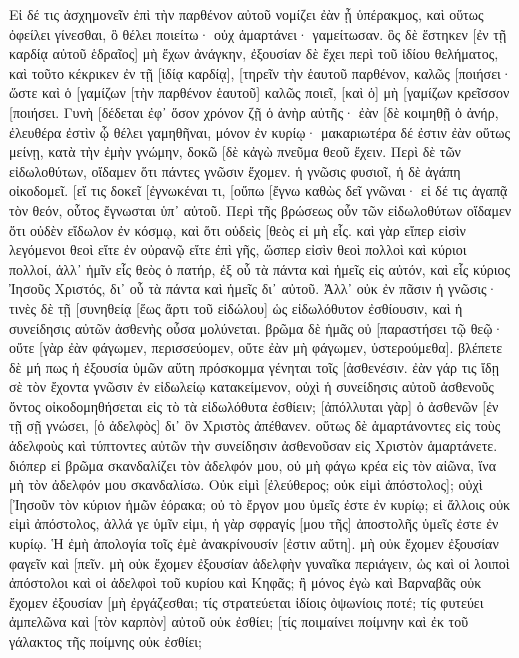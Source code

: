 Εἰ δέ τις ἀσχημονεῖν ἐπὶ τὴν παρθένον αὐτοῦ νομίζει ἐὰν ᾖ ὑπέρακμος, καὶ οὕτως ὀφείλει γίνεσθαι, ὃ θέλει ποιείτω· οὐχ ἁμαρτάνει· γαμείτωσαν. 
ὃς δὲ ἕστηκεν [ἐν τῇ καρδίᾳ αὐτοῦ ἑδραῖος] μὴ ἔχων ἀνάγκην, ἐξουσίαν δὲ ἔχει περὶ τοῦ ἰδίου θελήματος, καὶ τοῦτο κέκρικεν ἐν τῇ [ἰδίᾳ καρδίᾳ], [τηρεῖν τὴν ἑαυτοῦ παρθένον, καλῶς [ποιήσει· 
ὥστε καὶ ὁ [γαμίζων [τὴν παρθένον ἑαυτοῦ] καλῶς ποιεῖ, [καὶ ὁ] μὴ [γαμίζων κρεῖσσον [ποιήσει. 
Γυνὴ [δέδεται ἐφ᾽ ὅσον χρόνον ζῇ ὁ ἀνὴρ αὐτῆς· ἐὰν [δὲ κοιμηθῇ ὁ ἀνήρ, ἐλευθέρα ἐστὶν ᾧ θέλει γαμηθῆναι, μόνον ἐν κυρίῳ· 
μακαριωτέρα δέ ἐστιν ἐὰν οὕτως μείνῃ, κατὰ τὴν ἐμὴν γνώμην, δοκῶ [δὲ κἀγὼ πνεῦμα θεοῦ ἔχειν. 
Περὶ δὲ τῶν εἰδωλοθύτων, οἴδαμεν ὅτι πάντες γνῶσιν ἔχομεν. ἡ γνῶσις φυσιοῖ, ἡ δὲ ἀγάπη οἰκοδομεῖ. 
[εἴ τις δοκεῖ [ἐγνωκέναι τι, [οὔπω [ἔγνω καθὼς δεῖ γνῶναι· 
εἰ δέ τις ἀγαπᾷ τὸν θεόν, οὗτος ἔγνωσται ὑπ᾽ αὐτοῦ. 
Περὶ τῆς βρώσεως οὖν τῶν εἰδωλοθύτων οἴδαμεν ὅτι οὐδὲν εἴδωλον ἐν κόσμῳ, καὶ ὅτι οὐδεὶς [θεὸς εἰ μὴ εἷς. 
καὶ γὰρ εἴπερ εἰσὶν λεγόμενοι θεοὶ εἴτε ἐν οὐρανῷ εἴτε ἐπὶ γῆς, ὥσπερ εἰσὶν θεοὶ πολλοὶ καὶ κύριοι πολλοί, 
ἀλλ᾽ ἡμῖν εἷς θεὸς ὁ πατήρ, ἐξ οὗ τὰ πάντα καὶ ἡμεῖς εἰς αὐτόν, καὶ εἷς κύριος Ἰησοῦς Χριστός, δι᾽ οὗ τὰ πάντα καὶ ἡμεῖς δι᾽ αὐτοῦ. 
Ἀλλ᾽ οὐκ ἐν πᾶσιν ἡ γνῶσις· τινὲς δὲ τῇ [συνηθείᾳ [ἕως ἄρτι τοῦ εἰδώλου] ὡς εἰδωλόθυτον ἐσθίουσιν, καὶ ἡ συνείδησις αὐτῶν ἀσθενὴς οὖσα μολύνεται. 
βρῶμα δὲ ἡμᾶς οὐ [παραστήσει τῷ θεῷ· οὔτε [γὰρ ἐὰν φάγωμεν, περισσεύομεν, οὔτε ἐὰν μὴ φάγωμεν, ὑστερούμεθα]. 
βλέπετε δὲ μή πως ἡ ἐξουσία ὑμῶν αὕτη πρόσκομμα γένηται τοῖς [ἀσθενέσιν. 
ἐὰν γάρ τις ἴδῃ σὲ τὸν ἔχοντα γνῶσιν ἐν εἰδωλείῳ κατακείμενον, οὐχὶ ἡ συνείδησις αὐτοῦ ἀσθενοῦς ὄντος οἰκοδομηθήσεται εἰς τὸ τὰ εἰδωλόθυτα ἐσθίειν; 
[ἀπόλλυται γὰρ] ὁ ἀσθενῶν [ἐν τῇ σῇ γνώσει, [ὁ ἀδελφὸς] δι᾽ ὃν Χριστὸς ἀπέθανεν. 
οὕτως δὲ ἁμαρτάνοντες εἰς τοὺς ἀδελφοὺς καὶ τύπτοντες αὐτῶν τὴν συνείδησιν ἀσθενοῦσαν εἰς Χριστὸν ἁμαρτάνετε. 
διόπερ εἰ βρῶμα σκανδαλίζει τὸν ἀδελφόν μου, οὐ μὴ φάγω κρέα εἰς τὸν αἰῶνα, ἵνα μὴ τὸν ἀδελφόν μου σκανδαλίσω. 
Οὐκ εἰμὶ [ἐλεύθερος; οὐκ εἰμὶ ἀπόστολος]; οὐχὶ [Ἰησοῦν τὸν κύριον ἡμῶν ἑόρακα; οὐ τὸ ἔργον μου ὑμεῖς ἐστε ἐν κυρίῳ; 
εἰ ἄλλοις οὐκ εἰμὶ ἀπόστολος, ἀλλά γε ὑμῖν εἰμι, ἡ γὰρ σφραγίς [μου τῆς] ἀποστολῆς ὑμεῖς ἐστε ἐν κυρίῳ. 
Ἡ ἐμὴ ἀπολογία τοῖς ἐμὲ ἀνακρίνουσίν [ἐστιν αὕτη]. 
μὴ οὐκ ἔχομεν ἐξουσίαν φαγεῖν καὶ [πεῖν. 
μὴ οὐκ ἔχομεν ἐξουσίαν ἀδελφὴν γυναῖκα περιάγειν, ὡς καὶ οἱ λοιποὶ ἀπόστολοι καὶ οἱ ἀδελφοὶ τοῦ κυρίου καὶ Κηφᾶς; 
ἢ μόνος ἐγὼ καὶ Βαρναβᾶς οὐκ ἔχομεν ἐξουσίαν [μὴ ἐργάζεσθαι; 
τίς στρατεύεται ἰδίοις ὀψωνίοις ποτέ; τίς φυτεύει ἀμπελῶνα καὶ [τὸν καρπὸν] αὐτοῦ οὐκ ἐσθίει; [τίς ποιμαίνει ποίμνην καὶ ἐκ τοῦ γάλακτος τῆς ποίμνης οὐκ ἐσθίει; 
